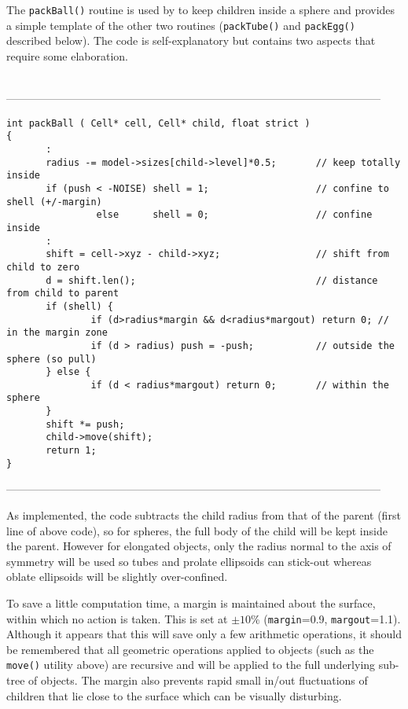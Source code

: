 The {\tt packBall()} routine is used by  to keep children inside a sphere and
provides a simple template of the other two routines ({\tt packTube()} and {\tt packEgg()}
described below).    The code is self-explanatory but contains two aspects that
require some elaboration.
\begin{singlespace}
\ \\
------------------------------------------------------------------------------------------------------
\begin{tiny}
\begin{verbatim}
int packBall ( Cell* cell, Cell* child, float strict )
{
       :
       radius -= model->sizes[child->level]*0.5;       // keep totally inside
       if (push < -NOISE) shell = 1;                   // confine to shell (+/-margin)
                else      shell = 0;                   // confine inside
       :
       shift = cell->xyz - child->xyz;                 // shift from child to zero
       d = shift.len();                                // distance from child to parent
       if (shell) {
               if (d>radius*margin && d<radius*margout) return 0; // in the margin zone
               if (d > radius) push = -push;           // outside the sphere (so pull)
       } else {
               if (d < radius*margout) return 0;       // within the sphere
       }
       shift *= push;
       child->move(shift);
       return 1;
}
\end{verbatim}
\end{tiny}
------------------------------------------------------------------------------------------------------
\end{singlespace}

As implemented, the code subtracts the child radius from that of the parent (first line of above code),
so for spheres, the full body of the child will be kept inside the parent.  However for elongated objects,
only the radius normal to the axis of symmetry will be used so tubes and prolate ellipsoids can stick-out
whereas oblate ellipsoids will be slightly over-confined.

To save a little computation time, a margin is maintained about the surface, within which no action is
taken.  This is set at $\pm10$\% ({\tt margin}=0.9, {\tt margout}=1.1).   Although it appears that this
will save only a few arithmetic operations, it should be remembered that all geometric operations
applied to objects (such as the {\tt move()} utility above) are
recursive and will be applied to the full underlying sub-tree of objects.
The margin also prevents rapid small in/out fluctuations of children that lie close to the surface
which can be visually disturbing.


